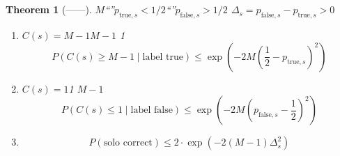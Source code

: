\documentclass[11pt,a4paper]{article}
\newtheorem{theorem}{Theorem}[section]
\theoremstyle{remark}
\begin{document}
\subsection{}

\begin{theorem}[——]
\label{thm:solo_truth}
$M$``''$p_{\text{true},s}
< 1/2$``''$p_{\text{false},s} > 1/2$
$\Delta_s = p_{\text{false},s} - p_{\text{true},s} > 0$

\begin{enumerate}[label=(\roman*)]
    \item $C(s) = M-1$$M-1$
          1
          \begin{equation}
              \boxed{P(C(s) \geq M-1 \mid \text{label true})
              \leq \exp\!\left(-2M\left(\frac{1}{2} - p_{\text{true},s}\right)^2\right)}
          \end{equation}

    \item $C(s) = 1$1
          $M-1$
          \begin{equation}
              \boxed{P(C(s) \leq 1 \mid \text{label false})
              \leq \exp\!\left(-2M\left(p_{\text{false},s} - \frac{1}{2}\right)^2\right)}
          \end{equation}

    \item 
          \begin{equation}
              \boxed{P(\text{solo correct}) \leq 2 \cdot \exp\!\left(-2(M-1)\Delta_s^2\right)}
          \end{equation}
\end{enumerate}
\end{theorem}

\subsection{}
\end{document}

